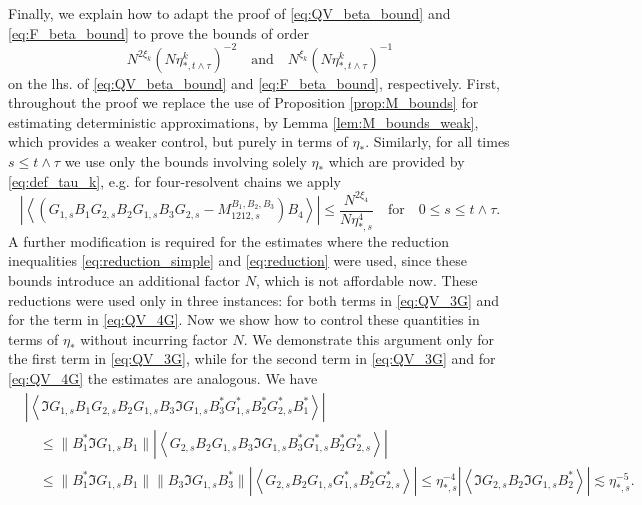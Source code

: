 \documentclass[10pt]{amsart}
\numberwithin{equation}{section}
\begin{document}
Finally, we explain how to adapt the proof of \eqref{eq:QV_beta_bound} and \eqref{eq:F_beta_bound} to prove the bounds of order 
\begin{equation*}
N^{2\xi_k}(N\eta_{*,t\wedge \tau}^k)^{-2}\quad\text{and}\quad N^{\xi_k}(N\eta_{*,t\wedge \tau}^k)^{-1}
\end{equation*}
on the lhs. of \eqref{eq:QV_beta_bound} and \eqref{eq:F_beta_bound}, respectively. First, throughout the proof we replace the use of Proposition \ref{prop:M_bounds} for estimating deterministic approximations, by Lemma \ref{lem:M_bounds_weak}, which provides a weaker control, but purely in terms of $\eta_*$. Similarly, for all times $s\le t\wedge\tau$ we use only the bounds involving solely $\eta_*$ which are provided by \eqref{eq:def_tau_k}, e.g. for four-resolvent chains we apply
\begin{equation}
\left\vert\left\langle \left(G_{1,s}B_1G_{2,s}B_2 G_{1,s}B_3G_{2,s}-M_{1212,s}^{B_1,B_2,B_3}\right)B_4\right\rangle\right\vert \le \frac{N^{2\xi_4}}{N\eta_{*,s}^4}\quad \text{for}\quad 0\le s\le t\wedge\tau.
\end{equation}
A further modification is required for the estimates where the reduction inequalities \eqref{eq:reduction_simple} and \eqref{eq:reduction} were used, since these bounds introduce an additional factor $N$, which is not affordable now. These reductions were used only in three instances: for both terms in \eqref{eq:QV_3G} and for the term in \eqref{eq:QV_4G}. Now we show how to control these quantities in terms of $\eta_*$ without incurring factor $N$. We demonstrate this argument only for the first term in \eqref{eq:QV_3G}, while for the second term in \eqref{eq:QV_3G} and for \eqref{eq:QV_4G} the estimates are analogous. We have
\begin{equation}
\begin{split}
&\left\vert\left\langle \Im G_{1,s} B_1 G_{2,s} B_2 G_{1,s} B_3 \Im G_{1,s} B_3^* G_{1,s}^* B_2^* G_{2,s}^* B_1^*\right\rangle\right\vert\\
&\quad \le \lVert B_1^*\Im G_{1,s}B_1\rVert \left\vert \left\langle G_{2,s} B_2 G_{1,s} B_3 \Im G_{1,s} B_3^* G_{1,s}^* B_2^* G_{2,s}^* \right\rangle\right\vert\\
&\quad \le \lVert B_1^*\Im G_{1,s}B_1\rVert \lVert B_3\Im G_{1,s}B_3^*\rVert \left\vert \left\langle G_{2,s} B_2 G_{1,s}G_{1,s}^* B_2^* G_{2,s}^* \right\rangle\right\vert\le \eta_{*,s}^{-4}\left\vert \left\langle \Im G_{2,s} B_2 \Im G_{1,s} B_2^* \right\rangle\right\vert\lesssim \eta_{*,s}^{-5}.
\end{split}
\label{eq:QV_3G_eta}
\end{equation}
\end{document}
